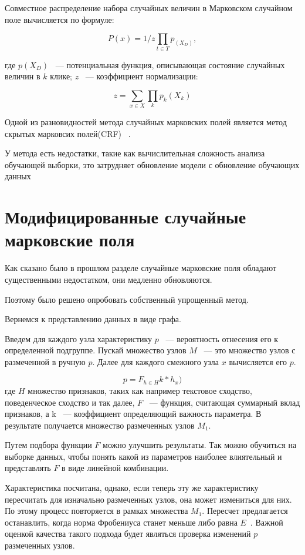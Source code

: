 \documentclass[annotation,times,page4]{itmo-student-thesis}
\begin{document}
Совместное распределение набора случайных величин в Марковском случайном поле вычисляется по формуле:

\[
    P(x) = 1/z\prod_{t \in T} p_(X_{D}),
\]

где $p (X_{D})$ ~--- потенциальная функция, описывающая состояние случайных величин в $k$ клике; $z$ ~--- коэффициент нормализации:

\[
    z = \sum_{x \in X}\prod_{k} p_{k} (X_{k})
\]

Одной из разновидностей метода случайных марковских полей является метод скрытых марковсих полей(CRF) ~\cite{lafferty2001conditional, антоноваметод}.

У метода есть недостатки, такие как вычислительная сложность анализа обучающей выборки, это затрудняет обновление модели с обновление обучающих данных 
\section{Модифицированные случайные марковские поля}
Как сказано было в прошлом разделе случайные марковские поля обладают существенными недостатком, они медленно обновляются.

Поэтому было решено опробовать собственный упрощенный метод.

Вернемся к представлению данных в виде графа. 

Введем для каждого узла характеристику $p$ ~--- вероятность отнесения его к определенной подгруппе. Пускай множество узлов $M$ ~--- это множество узлов с размеченной в ручную $p$. Далее для каждого смежного узла $x$ вычисляется его $p$. 

\[
    p = F_{h \in H}k*h_{x})
\] 
где $H$ множество признаков, таких как например текстовое сходство, поведенческое сходство и так далее, $F$ ~--- функция, считающая суммарный вклад признаков, а k ~--- коэффициент определяющий важность параметра. В результате получается множество размеченных узлов $M_{1}$.

Путем подбора функции $F$ можно улучшить результаты. Так можно обучиться на выборке данных, чтобы понять какой из параметров наиболее влиятельный и представлять $F$ в виде линейной комбинации.

Характеристика посчитана, однако, если теперь эту же характеристику пересчитать для изначально размеченных узлов, она может измениться для них. По этому процесс повторяется в рамках множества $M_{1}$. Пересчет предлагается останавлить, когда норма Фробениуса станет меньше либо равна $E$~\cite{ланкастер1978теория}. Важной оценкой качества такого подхода будет являться проверка изменений $p$ размеченных узлов. 
\end{document}
